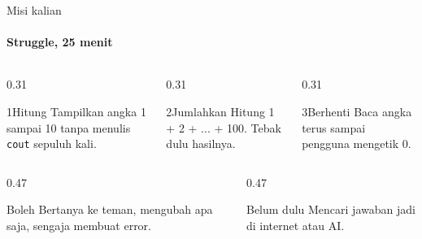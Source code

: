 \documentclass[t]{beamer}
\begin{document}

\begin{frame}{Misi kalian}
\framesubtitle{Struggle, 25 menit}
\begin{columns}[T]
\begin{column}{0.31\textwidth}
\begin{Langkah}{1}{Hitung}
Tampilkan angka 1 sampai 10 tanpa menulis \texttt{cout} sepuluh kali.
\end{Langkah}
\end{column}
\begin{column}{0.31\textwidth}
\begin{Langkah}{2}{Jumlahkan}
Hitung 1 + 2 + ... + 100. Tebak dulu hasilnya.
\end{Langkah}
\end{column}
\begin{column}{0.31\textwidth}
\begin{Langkah}{3}{Berhenti}
Baca angka terus sampai pengguna mengetik 0.
\end{Langkah}
\end{column}
\end{columns}
\vspace{8pt}
\begin{columns}[T]
\begin{column}{0.47\textwidth}
\begin{Blok}{Boleh}
Bertanya ke teman, mengubah apa saja, sengaja membuat error.
\end{Blok}
\end{column}
\begin{column}{0.47\textwidth}
\begin{BlokAlert}{Belum dulu}
Mencari jawaban jadi di internet atau AI.
\end{BlokAlert}
\end{column}
\end{columns}
\end{frame}
\end{document}
